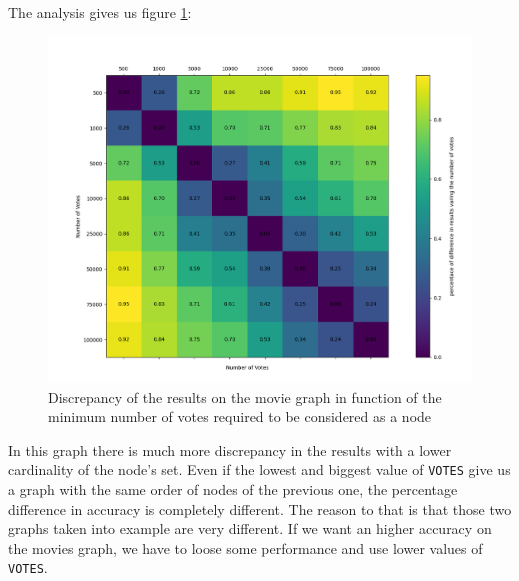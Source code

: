 \nd The analysis gives us figure \ref{fig:matrix-b}:
\begin{figure}[H]
    \centering
    \includegraphics[width=13cm]{Figure_2.png}
    \caption{Discrepancy of the results on the movie graph in function of the minimum number of votes required to be considered as a node}
    \label{fig:matrix-b}
\end{figure}
\newpage


\s \nd In this graph there is much more discrepancy in the results with a lower cardinality of the node's set. Even if the lowest and biggest value of \texttt{VOTES} give us a graph with the same order of nodes of the previous one, the percentage difference in accuracy is completely different. The reason to that is that those two graphs taken into example are very different. If we want an higher accuracy on the movies graph, we have to loose some performance and use lower values of \texttt{VOTES}.
